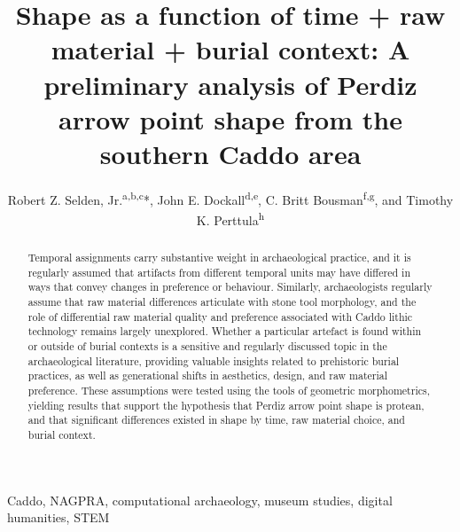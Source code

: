 \documentclass[review]{elsarticle}
\begin{document}
\begin{frontmatter}

\title{Shape as a function of time + raw material + burial context: A preliminary analysis of Perdiz arrow point shape from the southern Caddo area}

\author{Robert Z. Selden, Jr.\textsuperscript{a,b,c}*, John E. Dockall\textsuperscript{d,e}, C. Britt Bousman\textsuperscript{f,g}, and Timothy K. Perttula\textsuperscript{h}}
\address[1]{Heritage Research Center, Stephen F. Austin State University, US}
\address[2]{Cultural Heritage Department, Jean Monnet University, FR}
\address[3]{ORCID ID \href{http://orcid.org/0000-0002-1789-8449}{0000-0002-1789-8449}}
\address[4]{Cox|McClain Environmental Consulting, Inc., US}
\address[5]{ORCID ID \href{http://orcid.org/0000-0002-0940-7144}{0000-0002-0940-7144}}
\address[6]{Department of Anthropology, Texas State University, US}
\address[7]{ORCID ID \href{http://orcid.org/0000-0002-1645-8302}{0000-0002-1645-8302}}
\address[8]{Archeological \& Environmental Consultants, LLC, US}

\begin{abstract}
Temporal assignments carry substantive weight in archaeological practice, and it is regularly assumed that artifacts from different temporal units may have differed in ways that convey changes in preference or behaviour. Similarly, archaeologists regularly assume that raw material differences articulate with stone tool morphology, and the role of differential raw material quality and preference associated with Caddo lithic technology remains largely unexplored. Whether a particular artefact is found within or outside of burial contexts is a sensitive and regularly discussed topic in the archaeological literature, providing valuable insights related to prehistoric burial practices, as well as generational shifts in aesthetics, design, and raw material preference. These assumptions were tested using the tools of geometric morphometrics, yielding results that support the hypothesis that Perdiz arrow point shape is protean, and that significant differences existed in shape by time, raw material choice, and burial context.
\end{abstract}

\begin{keyword}
Caddo, NAGPRA, computational archaeology, museum studies, digital humanities, STEM
\end{keyword}

\end{frontmatter}
\end{document}

